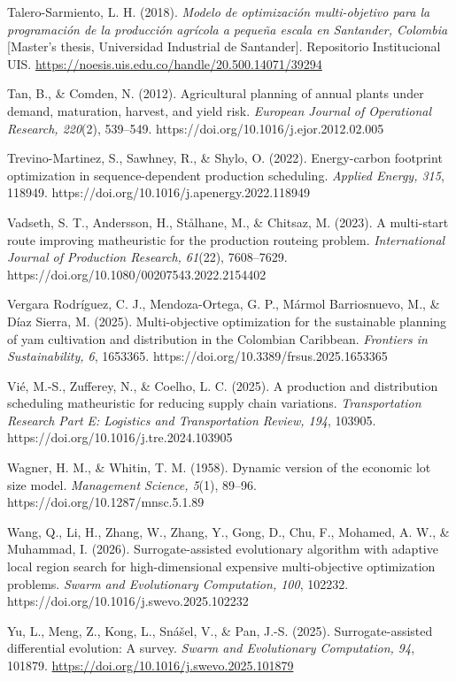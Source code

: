 \documentclass[]{interact}
\begin{document}
\begin{thebibliography}{}
Talero-Sarmiento, L. H. (2018). \emph{Modelo de optimizaci\'on multi-objetivo para la programaci\'on de la producci\'on agr\'icola a peque\~na escala en Santander, Colombia} [Master's thesis, Universidad Industrial de Santander]. Repositorio Institucional UIS. \url{https://noesis.uis.edu.co/handle/20.500.14071/39294}

Tan, B., \& Comden, N. (2012). Agricultural planning of annual plants under demand, maturation, harvest, and yield risk. \emph{European Journal of Operational Research, 220}(2), 539--549. https://doi.org/10.1016/j.ejor.2012.02.005

Trevino-Martinez, S., Sawhney, R., \& Shylo, O. (2022). Energy-carbon footprint optimization in sequence-dependent production scheduling. \emph{Applied Energy, 315}, 118949. https://doi.org/10.1016/j.apenergy.2022.118949

Vadseth, S. T., Andersson, H., St\aa lhane, M., \& Chitsaz, M. (2023). A multi-start route improving matheuristic for the production routeing problem. \emph{International Journal of Production Research, 61}(22), 7608--7629. https://doi.org/10.1080/00207543.2022.2154402

Vergara Rodr\'iguez, C. J., Mendoza-Ortega, G. P., M\'armol Barriosnuevo, M., \& D\'iaz Sierra, M. (2025). Multi-objective optimization for the sustainable planning of yam cultivation and distribution in the Colombian Caribbean. \emph{Frontiers in Sustainability, 6}, 1653365. https://doi.org/10.3389/frsus.2025.1653365

Vi\'e, M.-S., Zufferey, N., \& Coelho, L. C. (2025). A production and distribution scheduling matheuristic for reducing supply chain variations. \emph{Transportation Research Part E: Logistics and Transportation Review, 194}, 103905. https://doi.org/10.1016/j.tre.2024.103905

Wagner, H. M., \& Whitin, T. M. (1958). Dynamic version of the economic lot size model. \emph{Management Science, 5}(1), 89--96. https://doi.org/10.1287/mnsc.5.1.89

Wang, Q., Li, H., Zhang, W., Zhang, Y., Gong, D., Chu, F., Mohamed, A. W., \& Muhammad, I. (2026). Surrogate-assisted evolutionary algorithm with adaptive local region search for high-dimensional expensive multi-objective optimization problems. \emph{Swarm and Evolutionary Computation, 100}, 102232. https://doi.org/10.1016/j.swevo.2025.102232

Yu, L., Meng, Z., Kong, L., Sn\'a\v{s}el, V., \& Pan, J.-S. (2025). Surrogate-assisted differential evolution: A survey. \emph{Swarm and Evolutionary Computation, 94}, 101879. \url{https://doi.org/10.1016/j.swevo.2025.101879}

\end{thebibliography}
\end{document}
